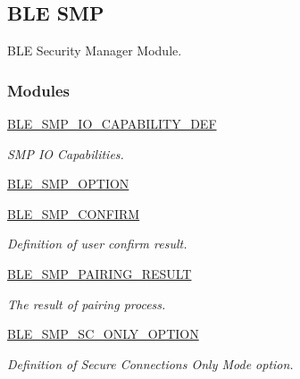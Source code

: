 \hypertarget{group___b_l_e___s_m_p}{}\subsection{B\+LE S\+MP}
\label{group___b_l_e___s_m_p}


B\+LE Security Manager Module.  


\subsubsection*{Modules}
\begin{DoxyCompactItemize}
\item 
\hyperlink{group___b_l_e___s_m_p___i_o___c_a_p_a_b_i_l_i_t_y___d_e_f}{B\+L\+E\+\_\+\+S\+M\+P\+\_\+\+I\+O\+\_\+\+C\+A\+P\+A\+B\+I\+L\+I\+T\+Y\+\_\+\+D\+EF}
\begin{DoxyCompactList}\small\item\em S\+MP IO Capabilities. \end{DoxyCompactList}\item 
\hyperlink{group___b_l_e___s_m_p___o_p_t_i_o_n}{B\+L\+E\+\_\+\+S\+M\+P\+\_\+\+O\+P\+T\+I\+ON}
\item 
\hyperlink{group___b_l_e___s_m_p___c_o_n_f_i_r_m}{B\+L\+E\+\_\+\+S\+M\+P\+\_\+\+C\+O\+N\+F\+I\+RM}
\begin{DoxyCompactList}\small\item\em Definition of user confirm result. \end{DoxyCompactList}\item 
\hyperlink{group___b_l_e___s_m_p___p_a_i_r_i_n_g___r_e_s_u_l_t}{B\+L\+E\+\_\+\+S\+M\+P\+\_\+\+P\+A\+I\+R\+I\+N\+G\+\_\+\+R\+E\+S\+U\+LT}
\begin{DoxyCompactList}\small\item\em The result of pairing process. \end{DoxyCompactList}\item 
\hyperlink{group___b_l_e___s_m_p___s_c___o_n_l_y___o_p_t_i_o_n}{B\+L\+E\+\_\+\+S\+M\+P\+\_\+\+S\+C\+\_\+\+O\+N\+L\+Y\+\_\+\+O\+P\+T\+I\+ON}
\begin{DoxyCompactList}\small\item\em Definition of Secure Connections Only Mode option. \end{DoxyCompactList}\end{DoxyCompactItemize}
